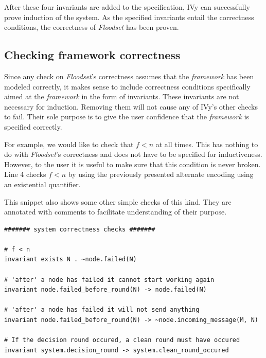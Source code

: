 \documentclass[fleqn]{article}
\begin{document}
After these four invariants are added to the specification, IVy can successfully prove induction of the system. As the specified invariants entail the correctness conditions, the correctness of \textit{Floodset} has been proven.


\subsection{Checking framework correctness}

Since any check on \textit{Floodset}'s correctness assumes that the \textit{framework} has been modeled correctly, it makes sense to include correctness conditions specifically aimed at the \textit{framework} in the form of invariants. These invariants are not necessary for induction. Removing them will not cause any of IVy's other checks to fail. Their sole purpose is to give the user confidence that the \textit{framework} is specified correctly.

For example, we would like to check that $f < n$ at all times. This has nothing to do with \textit{Floodset}'s correctness and does not have to be specified for inductiveness. However, to the user it is useful to make sure that this condition is never broken. Line 4 checks $f < n$ by using the previously presented alternate encoding using an existential quantifier.

This snippet also shows some other simple checks of this kind. They are annotated with comments to facilitate understanding of their purpose.

\begin{mdframed}[nobreak=true, backgroundcolor=light-gray, roundcorner=10pt,leftmargin=1, rightmargin=1, innerleftmargin=15, innertopmargin=15,innerbottommargin=15, outerlinewidth=1, linecolor=light-gray]
\begin{lstlisting}
####### system correctness checks #######

# f < n
invariant exists N . ~node.failed(N)

# 'after' a node has failed it cannot start working again
invariant node.failed_before_round(N) -> node.failed(N)

# 'after' a node has failed it will not send anything
invariant node.failed_before_round(N) -> ~node.incoming_message(M, N)

# If the decision round occured, a clean round must have occured
invariant system.decision_round -> system.clean_round_occured

\end{lstlisting}
\end{mdframed}
\end{document}
